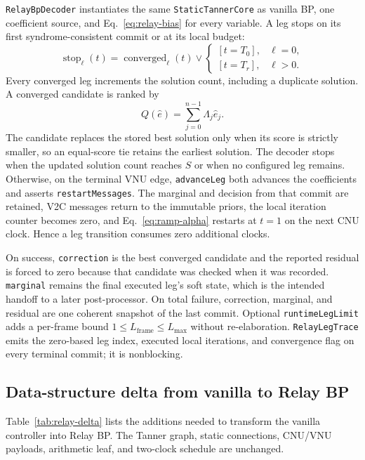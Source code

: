 \documentclass[10pt,conference]{IEEEtran}
\begin{document}
\texttt{RelayBpDecoder} instantiates the same \texttt{StaticTannerCore} as
vanilla BP, one coefficient source, and Eq.~\eqref{eq:relay-bias} for every
variable.  A leg stops on its first syndrome-consistent commit or at its local
budget:
\begin{equation}
 \operatorname{stop}_{\ell}(t)=
 \operatorname{converged}_{\ell}(t)\lor
 \begin{cases}
 [t=T_0],&\ell=0,\\
 [t=T_r],&\ell>0.
 \end{cases}
 \label{eq:relay-leg-stop}
\end{equation}
Every converged leg increments the solution count, including a duplicate
solution.  A converged candidate is ranked by
\begin{equation}
 Q(\hat e)=\sum_{j=0}^{n-1}\Lambda_j\hat e_j.
 \label{eq:relay-score}
\end{equation}
The candidate replaces the stored best solution only when its score is
strictly smaller, so an equal-score tie retains the earliest solution.  The
decoder stops when the updated solution count reaches $S$ or when no configured
leg remains.  Otherwise, on the terminal VNU edge, \texttt{advanceLeg} both
advances the coefficients and asserts \texttt{restartMessages}.  The marginal
and decision from that commit are retained, V2C messages return to the immutable
priors, the local iteration counter becomes zero, and Eq.~\eqref{eq:ramp-alpha}
restarts at $t=1$ on the next CNU clock.  Hence a leg transition consumes zero
additional clocks.

On success, \texttt{correction} is the best converged candidate and the
reported residual is forced to zero because that candidate was checked when it
was recorded.  \texttt{marginal} remains the final executed leg's soft state,
which is the intended handoff to a later post-processor.  On total failure,
correction, marginal, and residual are one coherent snapshot of the last
commit.  Optional \texttt{runtimeLegLimit} adds a per-frame bound
$1\leq L_{\mathrm{frame}}\leq L_{\max}$ without re-elaboration.
\texttt{RelayLegTrace} emits the zero-based leg index, executed local
iterations, and convergence flag on every terminal commit; it is nonblocking.

\subsection{Data-structure delta from vanilla to Relay BP}
Table~\ref{tab:relay-delta} lists the additions needed to transform the vanilla
controller into Relay BP.  The Tanner graph, static connections, CNU/VNU
payloads, arithmetic leaf, and two-clock schedule are unchanged.
\end{document}
